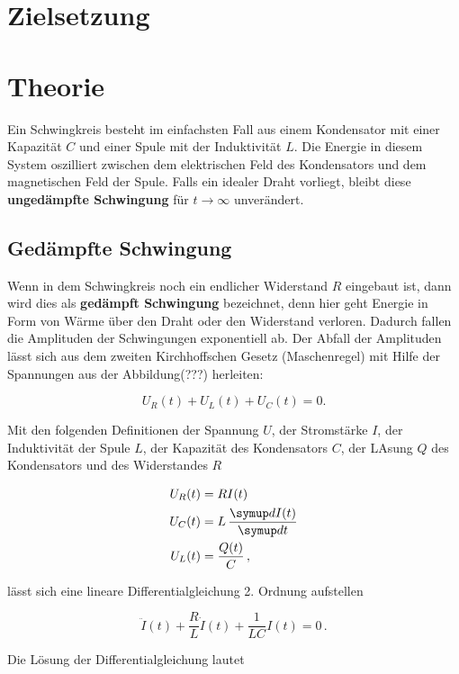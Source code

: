 \section{Zielsetzung}

\section{Theorie}
Ein Schwingkreis besteht im einfachsten Fall aus einem Kondensator mit einer Kapazität $C$ und einer Spule mit der Induktivität $L$.
Die Energie in diesem System oszilliert zwischen dem elektrischen Feld des Kondensators und dem magnetischen Feld der Spule.
Falls ein idealer Draht vorliegt, bleibt diese \textbf{ungedämpfte Schwingung} für $ t \to \infty $ unverändert.

\subsection{Gedämpfte Schwingung}
Wenn  in dem Schwingkreis noch ein endlicher Widerstand $R$ eingebaut ist, dann wird dies als \textbf{gedämpft Schwingung}
bezeichnet, denn hier geht Energie in Form von Wärme über den Draht oder den Widerstand verloren. Dadurch fallen die Amplituden
der Schwingungen exponentiell ab.
Der Abfall der Amplituden lässt sich aus dem zweiten Kirchhoffschen Gesetz (Maschenregel) mit Hilfe der Spannungen aus der Abbildung(???)
herleiten:

\begin{equation*}
  U_R(t) + U_L(t) + U_C(t) = 0.
\end{equation*}

Mit den folgenden Definitionen der Spannung $U$, der Stromstärke $I$, der Induktivität der Spule $L$,
der Kapazität des Kondensators $C$, der LAsung $Q$ des Kondensators und des Widerstandes $R$

\begin{align*}
  U_R(t) &= R I(t) \\
  U_C(t) &= L \, \frac{\symup d I(t)}{\symup d t} \\
  U_L(t) &= \frac{Q(t)}{C} \, ,
\end{align*}

lässt sich eine lineare Differentialgleichung 2. Ordnung aufstellen

\begin{equation*}
  \ddot{I}(t) + \frac{R}{L} \dot{I}(t) + \frac{1}{LC} I(t) = 0 \, .
\end{equation*}

Die Lösung der Differentialgleichung lautet

